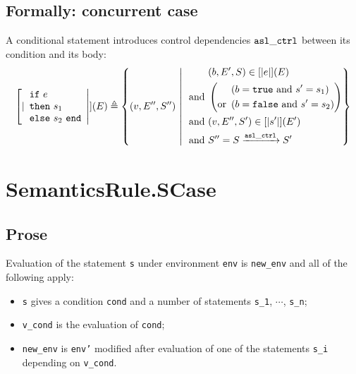 \documentclass{book}
\begin{document}
\begin{formal}
  \subsection{Formally: concurrent case}
  A conditional statement introduces control dependencies $\mathtt{asl\_ctrl}$ between its
  condition and its body:
  \begin{align}
    \left[| \begin{array}{l}
      \mathtt{if}\ e\\
      \mathtt{then}\ s_1\\
      \mathtt{else}\ s_2\ \mathtt{end}
    \end{array} \right|] (E) \triangleq
      \left\{ (v, E'', S'') \ \middle|\ {} \
      \begin{aligned}
        & (b, E', S) \in \left[| e \right|] (E)
        \\ \text{and}\ &
        \left( \begin{aligned}
          & \left(b = \mathtt{true}\ \text{and}\ s' = s_1 \right)
          \\ \text{or}\ &
          \left( b = \mathtt{false}\ \text{and}\ s' = s_2 \right)
        \end{aligned} \right)
        \\ \text{and}\ &
        (v, E'', S') \in \left[| s' \right|] (E')
        \\ \text{and}\ &
        S'' = S \xrightarrow{\mathtt{asl\_ctrl}} S'
      \end{aligned}
      \right\}
    \label{eq:sem-conc-scond}
  \end{align}
\end{formal}


\section{SemanticsRule.SCase \label{sec:SemanticsRule.SCase}}

    \subsection{Prose}
  Evaluation of the statement \texttt{s} under environment \texttt{env} is
\texttt{new\_env} and all of the following apply:
    \begin{itemize}
    \item \texttt{s} gives a condition \texttt{cond} and a number of statements \texttt{s\_1}, $\cdots$, \texttt{s\_n};
    \item \texttt{v\_cond} is the evaluation of \texttt{cond};
    \item \texttt{new\_env} is \texttt{env'} modified after evaluation of one of the statements \texttt{s\_i} depending on \texttt{v\_cond}.
    \end{itemize}
\end{document}
